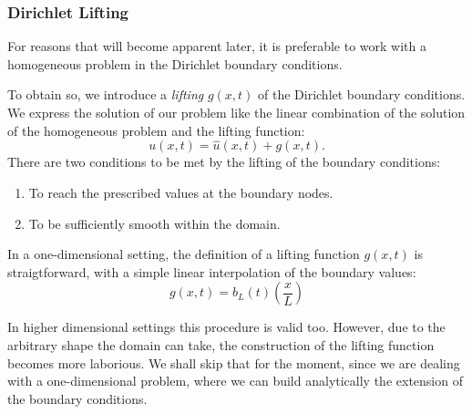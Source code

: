 \documentclass[../../thesis.tex]{subfiles}
\begin{document}
\subsubsection{Dirichlet Lifting}
\label{sec:1d_fom_heat_equation_dirichlet_lifting}
For reasons that will become apparent later, it is preferable to work with a homogeneous problem in the Dirichlet boundary conditions.

To obtain so, we introduce a \emph{lifting} $g(x,t)$ of the Dirichlet boundary conditions.
We express the solution of our problem like the linear combination of the solution of the homogeneous problem and the lifting function:
\begin{equation}
    \label{eq:1d_fom_homogeneous_plus_lifting}
    u(x,t) = \hat{u}(x,t) + g(x,t).
\end{equation}
There are two conditions to be met by the lifting of the boundary conditions:
\begin{enumerate}
    \item To reach the prescribed values at the boundary nodes.
    \item To be sufficiently smooth within the domain.
\end{enumerate}
In a one-dimensional setting, the definition of a lifting function $g(x,t)$ is straigtforward, with a simple linear interpolation of the boundary values:
\begin{equation}
    \label{eq:1d_fom_dirichlet_lifting}
    g(x,t) = b_L(t) \left(\frac{x}{L}\right)
\end{equation}

In higher dimensional settings this procedure is valid too. 
However, due to the arbitrary shape the domain can take, the construction of the lifting function becomes more laborious.
We shall skip that for the moment, since we are dealing with a one-dimensional problem, where we can build analytically the extension of the boundary conditions. 
\end{document}
